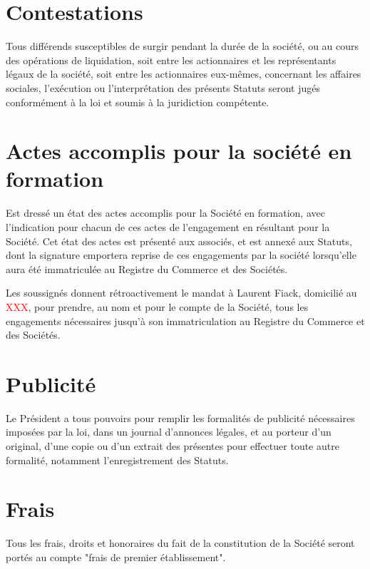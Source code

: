 \documentclass[a4paper,12pt]{report}
\begin{document}
\section{Contestations}
Tous différends susceptibles de surgir pendant la durée de la société, ou au cours des opérations de liquidation, soit entre les actionnaires et les représentants légaux de la société, soit entre les actionnaires eux-mêmes, concernant les affaires sociales, l'exécution ou l'interprétation des présents Statuts seront jugés conformément à la loi et soumis à la juridiction compétente.

\section{Actes accomplis pour la société en formation}
Est dressé un état des actes accomplis pour la Société en formation, avec l'indication pour chacun de ces actes de l'engagement en résultant pour la Société. Cet état des actes est présenté aux associés, et est annexé aux Statuts, dont la signature emportera reprise de ces engagements par la société lorsqu'elle aura été immatriculée au Registre du Commerce et des Sociétés.

Les soussignés donnent rétroactivement le mandat à Laurent Fiack, domicilié au \textcolor{red}{XXX}, pour prendre, au nom et pour le compte de la Société, tous les engagements nécessaires jusqu'à son immatriculation au Registre du Commerce et des Sociétés.

\section{Publicité}
Le Président a tous pouvoirs pour remplir les formalités de publicité nécessaires imposées par la loi, dans un journal d'annonces légales, et au porteur d'un original, d'une copie ou d'un extrait des présentes pour effectuer toute autre formalité, notamment l'enregistrement des Statuts.

\section{Frais}
Tous les frais, droits et honoraires du fait de la constitution de la Société seront portés au compte "frais de premier établissement".
\end{document}
